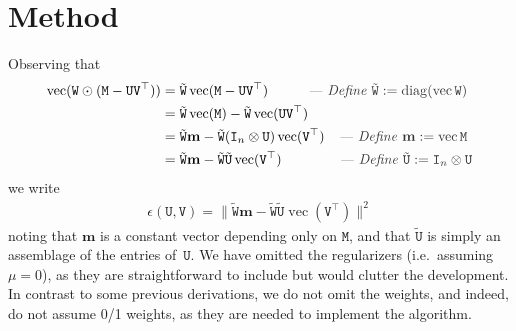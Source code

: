 \documentclass[runningheads]{llncs}
\def\eqlabel#1{\label{eq:#1}}
\def\tr{^\top}
\def\xcomment#1{\textcolor[gray]{.2}{\text{\em---#1}}}
\def\comment#1{\kern-1cm\xcomment{#1}}
\def\vec{\operatorname{vec}}
\def\hadamard{\odot}
\def\m#1{\ensuremath{\mathtt{#1}}}
\def\v#1{\ensuremath{\mathbf{#1}}}
\def\mU{\m U}
\def\mV{\m V}
\def\mW{\m W}
\def\mM{\m M}
\def\err{\epsilon}
\def\twiddle#1{{\tilde{#1}}}
\def\tU{\twiddle\mU}
\def\tW{\twiddle\mW}
\begin{document}

\section{Method}
Observing that 
\begin{align}
\vec(\mW \hadamard (\mM - \mU \mV\tr))
  & = \tW \vec(\mM - \mU \mV\tr) & \comment{ Define $\tW := \operatorname{diag}(\vec\mW)$ }
\\& = \tW \vec(\mM) - \tW \vec(\mU \mV\tr)
\\& = \tW \v m - \tW (\kron{\Id n}{\mU}) \vec(\mV\tr) & \xcomment{ Define $\v m := \vec\mM$ }
\eqlabel{resvec1}
\\& = \tW\v m - \tW \twiddle \mU \vec(\mV\tr) &
\comment{ Define $\twiddle\mU := \kron{\Id n}{\mU}$}
\eqlabel{resvec2}
\end{align}
we write
\def\vecnorm#1{\|\!\vec{#1}\|^2}
\begin{align}
\err(\m U, \m V) = \|\tW\v m - \tW \twiddle \mU \vec(\mV\tr)\|^2 
\end{align}
noting that $\v m$ is a constant vector depending only on $\mM$, and that $\tU$ is simply an assemblage of the entries of~\mU.  We have omitted the regularizers (i.e.\ assuming $\mu=0$), as they are straightforward to include but would clutter the development.   In contrast to some previous derivations, we do not omit the weights, and indeed, do not assume 0/1 weights, as they are needed to implement the algorithm.
\end{document}
